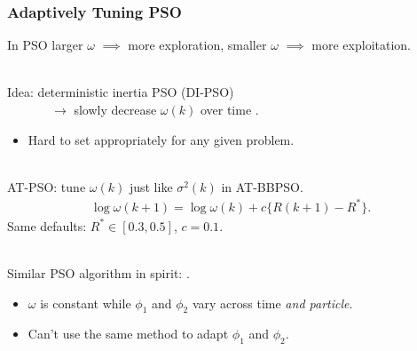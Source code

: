 \documentclass[xcolor=dvipsnames]{beamer}
\begin{document}
\begin{frame}
\frametitle{Adaptively Tuning PSO}
In PSO larger $\omega$ $\implies$ more exploration, smaller $\omega$ $\implies$ more exploitation.\\~\\

\pause

Idea: deterministic inertia PSO (DI-PSO) \\
\ \ \ \ \ \ \ $\to$ slowly decrease $\omega(k)$ over time \citep{eberhart2000comparing}.
\begin{itemize}
\item Hard to set appropriately for any given problem.\\~\\
\end{itemize}

\pause

 AT-PSO: tune $\omega(k)$ just like $\sigma^2(k)$ in AT-BBPSO.
\begin{align*}
\log\omega(k+1) = \log\omega(k) + c\{R(k+1) - R^*\}.
\end{align*}
\pause
Same defaults: $R^*\in[0.3, 0.5]$, $c = 0.1$.\\~\\

\pause

Similar PSO algorithm in spirit: \cite{zhang2003adaptive}.
\begin{itemize} 
\item $\omega$ is constant while $\phi_1$ and $\phi_2$ vary across time {\color{red}\emph{and particle}}. 
\item Can't use the same method to adapt $\phi_1$ and $\phi_2$.
\end{itemize}
\end{frame}
\end{document}
